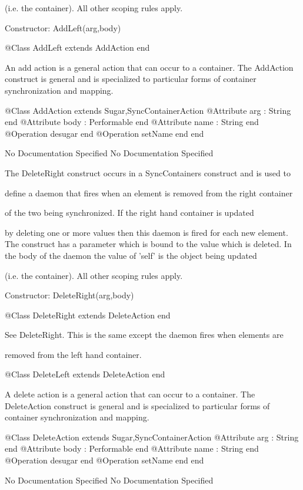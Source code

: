       (i.e. the container). All other scoping rules apply.
      
      Constructor: AddLeft(arg,body)
\begin{Interface}
@Class AddLeft extends AddAction
end
\end{Interface}

      An add action is a general action that can occur to a container.
      The AddAction construct is general and is specialized to particular 
      forms of container synchronization and mapping.
\begin{Interface}
@Class AddAction extends Sugar,SyncContainerAction
  @Attribute arg : String end
  @Attribute body : Performable end
  @Attribute name : String end
  @Operation desugar end
  @Operation setName end
end
\end{Interface}
No Documentation Specified
No Documentation Specified

      The DeleteRight construct occurs in a SyncContainers construct and is used to

      define a daemon that fires when an element is removed from the right container

      of the two being synchronized. If the right hand container is updated

      by deleting one or more values then this daemon is fired for each new element.
      The construct has a parameter which is bound to the value which is deleted.
      In the body of the daemon the value of 'self' is the object being updated

      (i.e. the container). All other scoping rules apply.
     
      Constructor: DeleteRight(arg,body)
\begin{Interface}
@Class DeleteRight extends DeleteAction
end
\end{Interface}

      See DeleteRight. This is the same except the daemon fires when elements are

      removed from the left hand container.
\begin{Interface}
@Class DeleteLeft extends DeleteAction
end
\end{Interface}

      A delete action is a general action that can occur to a container.
      The DeleteAction construct is general and is specialized to particular 
      forms of container synchronization and mapping.
\begin{Interface}
@Class DeleteAction extends Sugar,SyncContainerAction
  @Attribute arg : String end
  @Attribute body : Performable end
  @Attribute name : String end
  @Operation desugar end
  @Operation setName end
end
\end{Interface}
No Documentation Specified
No Documentation Specified

